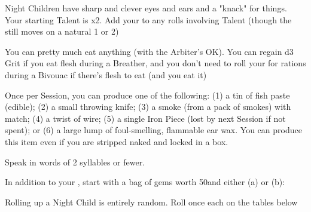 {  
  Night Children have sharp and clever eyes and ears and a "knack" for things.  Your starting Talent is \DCUP x2.  Add your \LVL to any rolls involving Talent (though the \UD still moves \DCDOWN on a natural 1 or 2)


  You can pretty much eat anything (with the Arbiter's OK).  You can regain d3 Grit if you eat flesh during a Breather, and you don't need to roll your \UD for rations during a Bivouac if there's flesh to eat (and you eat it)

  Once per Session, you can produce one of the following:  (1) a tin of fish paste (edible); (2) a small throwing knife; (3) a smoke (from a pack of smokes) with match; (4) a twist of wire; (5) a single Iron Piece (lost by next Session if not spent); or (6) a large lump of foul-smelling, flammable ear wax.  You can produce this item even if you are stripped naked and locked in a box.

  Speak in words of 2 syllables or fewer.


  In addition to your , start with a bag of gems worth 50\FE and either (a) or (b):



  Rolling up a Night Child is entirely random. Roll once each on the tables below

}
